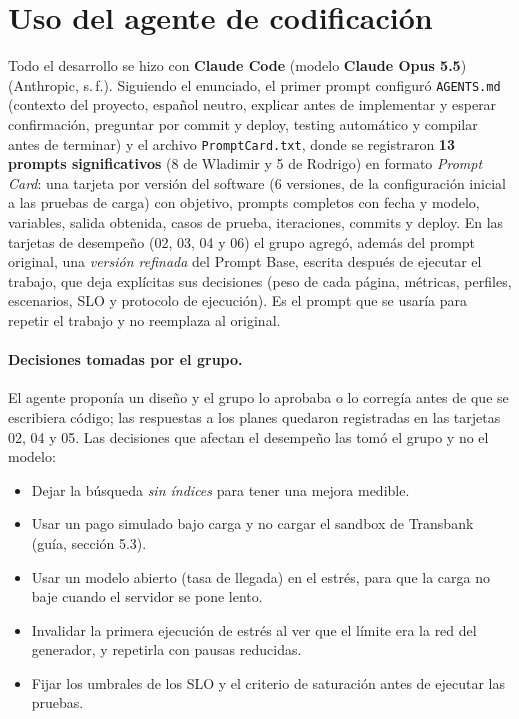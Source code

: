 \documentclass[11pt,a4paper]{article}
\newcommand{\codigo}[1]{\texttt{#1}}
\begin{document}
\section{Uso del agente de codificación}
\label{sec:agente}

Todo el desarrollo se hizo con \textbf{Claude Code} (modelo \textbf{Claude Opus
5.5}) (Anthropic, s.\,f.). Siguiendo el enunciado, el primer prompt configuró \codigo{AGENTS.md}
(contexto del proyecto, español neutro, explicar antes de implementar y esperar
confirmación, preguntar por commit y deploy, testing automático y compilar antes
de terminar) y el archivo \codigo{PromptCard.txt}, donde se registraron
\textbf{13 prompts significativos} (8 de Wladimir y 5 de Rodrigo) en formato
\emph{Prompt Card}: una tarjeta por versión del software (6 versiones, de la
configuración inicial a las pruebas de carga) con objetivo, prompts completos
con fecha y modelo, variables, salida obtenida, casos de prueba, iteraciones,
commits y deploy.
En las tarjetas de desempeño (02, 03, 04 y 06) el grupo agregó, además del
prompt original, una \emph{versión refinada} del Prompt Base, escrita después
de ejecutar el trabajo, que deja explícitas sus decisiones (peso de cada
página, métricas, perfiles, escenarios, SLO y protocolo de ejecución). Es el
prompt que se usaría para repetir el trabajo y no reemplaza al original.

\paragraph{Decisiones tomadas por el grupo.} El agente proponía un diseño y
el grupo lo aprobaba o lo corregía antes de que se escribiera código; las
respuestas a los planes quedaron registradas en las tarjetas 02, 04 y 05.
Las decisiones que afectan el desempeño las tomó el grupo y no el modelo:
\begin{itemize}
  \item Dejar la búsqueda \emph{sin índices} para tener una mejora medible.
  \item Usar un pago simulado bajo carga y no cargar el sandbox de Transbank
        (guía, sección 5.3).
  \item Usar un modelo abierto (tasa de llegada) en el estrés, para que la
        carga no baje cuando el servidor se pone lento.
  \item Invalidar la primera ejecución de estrés al ver que el límite era la red
        del generador, y repetirla con pausas reducidas.
  \item Fijar los umbrales de los SLO y el criterio de saturación antes de
        ejecutar las pruebas.
\end{itemize}
\end{document}
